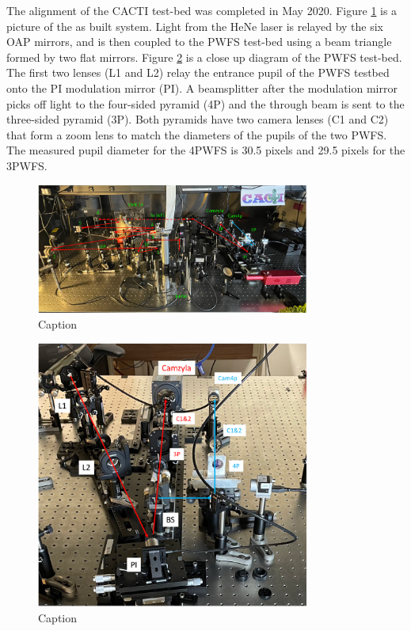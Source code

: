 \documentclass[12pt]{spieman}  %
\begin{document}
\begin{spacing}{2}
The alignment of the CACTI test-bed was completed in May 2020. Figure \ref{fig:cactiTestbed} is a picture of the as built system. Light from the HeNe laser is relayed by the six OAP mirrors, and is then coupled to the PWFS test-bed using a beam triangle formed by two flat mirrors. Figure \ref{fig:PWFStestbed} is a close up diagram of the PWFS test-bed. The first two lenses (L1 and L2) relay the entrance pupil of the PWFS testbed onto the PI modulation mirror (PI). A beamsplitter after the modulation mirror picks off light to the four-sided pyramid (4P) and the through beam is sent to the three-sided pyramid (3P). Both pyramids have two camera lenses (C1 and C2) that form a zoom lens to match the diameters of the pupils of the two PWFS. The measured pupil diameter for the 4PWFS is 30.5 pixels and 29.5 pixels for the 3PWFS. 

\begin{figure}
    \centering
    \includegraphics[width=0.8\textwidth]{cactiTestbed.png}
    \caption{Caption}
    \label{fig:cactiTestbed}
\end{figure}

\begin{figure}
    \centering
    \includegraphics[width=0.8\textwidth]{PWFStestbed.png}
    \caption{Caption}
    \label{fig:PWFStestbed}
\end{figure}



\end{spacing}
\end{document}
